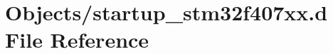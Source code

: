 \hypertarget{startup__stm32f407xx_8d}{}\section{Objects/startup\+\_\+stm32f407xx.d File Reference}
\label{startup__stm32f407xx_8d}
